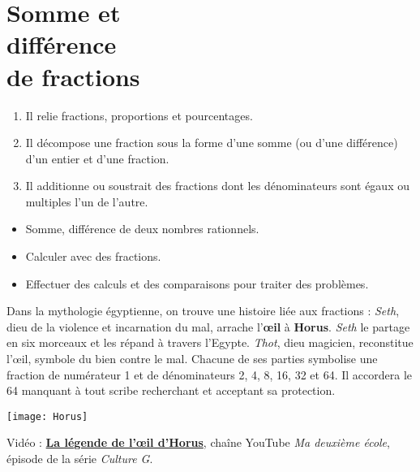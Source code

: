 \themaN
\graphicspath{{../../S26_Somme_et_difference_de_fractions/Images/}}

\chapter{Somme et\\différence\\de fractions}
\label{S26}


\begin{autoeval}
   \small
   \begin{enumerate}
      \item Il relie fractions, proportions et pourcentages.
      \item Il décompose une fraction sous la forme d’une somme (ou d’une différence) d’un entier et d’une fraction.
      \item Il additionne ou soustrait des fractions dont les dénominateurs sont égaux ou multiples l’un de l’autre.
   \end{enumerate}
\end{autoeval}

\begin{prerequis}
   \begin{itemize}
      \item Somme, différence de deux nombres rationnels.
      \item[\com] Calculer avec des fractions.
      \item[\com] Effectuer des calculs et des comparaisons pour traiter des problèmes.
   \end{itemize}
\end{prerequis}

\vfill

\begin{debat} 
   Dans la mythologie égyptienne, on trouve une histoire liée aux fractions : {\it Seth}, dieu de la violence et incarnation du mal, arrache l’{\bf œil} à {\bf Horus}. {\it Seth} le partage en six morceaux et les répand à travers l’Egypte. {\it Thot}, dieu magicien, reconstitue l’œil, symbole du bien contre le mal. Chacune de ses parties symbolise une fraction de numérateur 1 et de dénominateurs 2, 4, 8, 16, 32 et 64. Il accordera le 64 manquant à tout scribe recherchant et acceptant sa protection.
   \begin{center}
      \texttt{[image: Horus]}
   \end{center}
   \bigskip
   \begin{cadre}[B2][J4]
      \begin{center}
         Vidéo : \href{https://www.yout-ube.com/watch?v=yHft4m1Gi7k}{\bf La légende de l'\oe il d'Horus}, chaîne YouTube {\it Ma deuxième école}, épisode de la série {\it Culture G}.
      \end{center}
   \end{cadre}
\end{debat}



